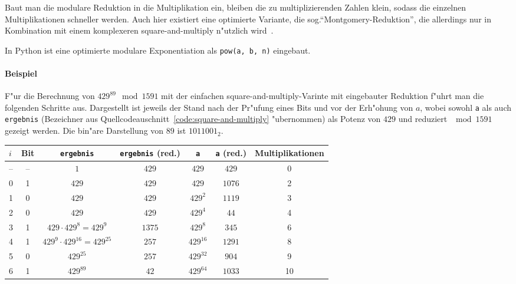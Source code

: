 \documentclass[12pt]{article}
\begin{document}
Baut man die modulare Reduktion in die Multiplikation ein,
bleiben die zu multiplizierenden Zahlen klein, sodass die einzelnen
Multiplikationen schneller werden.
Auch hier existiert eine optimierte Variante, die sog.\@ "`Montgomery-Reduktion"',
die allerdings nur in Kombination mit einem komplexeren square-and-multiply n"utzlich wird~\cite{hac}.

In Python ist eine optimierte modulare Exponentiation als \lstinline{pow(a, b, n)} eingebaut.

\paragraph{Beispiel}
F"ur die Berechnung von $429^{89} \mod 1591$ mit der einfachen square-and-multiply-Varinte
mit eingebauter Reduktion f"uhrt man die folgenden Schritte aus.
Dargestellt ist jeweils der Stand nach der Pr"ufung eines Bits und vor der Erh"ohung von $a$,
wobei sowohl \texttt{a} als auch \texttt{ergebnis} (Bezeichner aus Quellcodeauschnitt~\ref{code:square-and-multiply} "ubernommen)
als Potenz von $429$ und reduziert $\mod 1591$ gezeigt werden.
Die bin"are Darstellung von $89$ ist $1011001_2$. \\

\begin{tabular}{l|c c c c c c}
    $i$ & Bit & \texttt{ergebnis} & \texttt{ergebnis} (red.\@) & \texttt{a} & \texttt{a} (red.\@) & Multiplikationen\\
    \hline
    \hline
    -- & -- & $1$ & $429$ & $429$ & $429$ & 0 \\
    \hline
    0 & 1 & $429$ & $429$ & $429$ & $1076$ & 2 \\
    1 & 0 & $429$ & $429$ & $429^2$ & $1119$ & 3 \\
    2 & 0 & $429$ & $429$ & $429^4$ & $44$ & 4 \\
    3 & 1 & $429 \cdot 429^8 = 429^9$ & $1375$ & $429^8$ & $345$ & 6 \\
    4 & 1 & $429^9 \cdot 429^{16} = 429^{25}$ & $257$ & $429^{16}$ & $1291$ & 8 \\
    5 & 0 & $429^{25}$ & $257$ & $429^{32}$ & $904$ & 9 \\
    6 & 1 & $429^{89}$ & $42$ & $429^{64}$ & $1033$ & 10 \\
\end{tabular}
\end{document}
